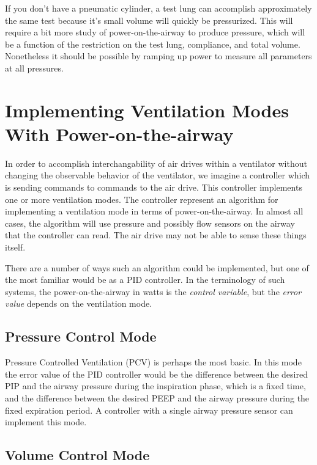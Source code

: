 \documentclass{article}
\begin{document}
If you don't have a pneumatic cylinder, a test lung can accomplish approximately the
same test because it's small volume will quickly be pressurized. This will require
a bit more study of power-on-the-airway to produce pressure, which will be a function
of the restriction on the test lung, compliance, and total volume. Nonetheless it should
be possible by ramping up power to measure all parameters at all pressures.

\section{Implementing Ventilation Modes With Power-on-the-airway}

In order to accomplish interchangability of air drives within a ventilator without
changing the observable behavior of the ventilator, we imagine a controller which
is sending commands to commands to the air drive.
This controller implements one or more ventilation modes.
The controller represent an algorithm for implementing a ventilation mode
in terms of power-on-the-airway. In almost all cases, the algorithm will use
pressure and possibly flow sensors on the airway that the controller can read.
The air drive may not be able to sense these things itself.

There are a number of ways such an algorithm could be implemented, but
one of the most familiar would be as a PID controller. In the terminology
of such systems, the power-on-the-airway in watts is the {\em control variable},
but the {\em error value} depends on the ventilation mode.

\subsection{Pressure Control Mode}

Pressure Controlled Ventilation (PCV) is perhaps the most basic.
In this mode the error value of the PID controller would be the difference
between the desired PIP and the airway pressure during the inspiration phase,
which is a fixed time, and the difference between the desired PEEP and the
airway pressure during the fixed expiration period. A controller with a single
airway pressure sensor can implement this mode.

\subsection{Volume Control Mode}
\end{document}
